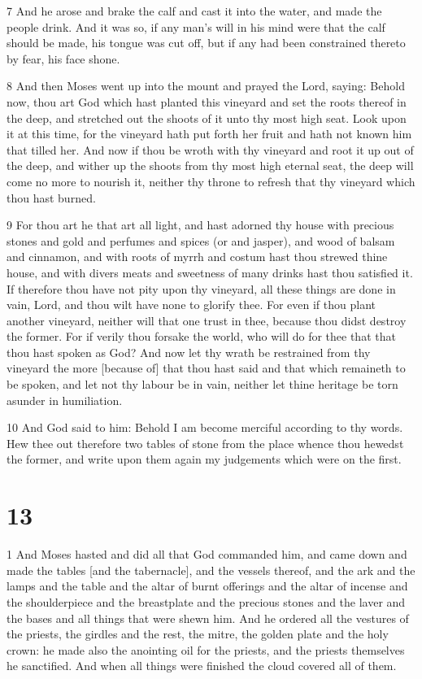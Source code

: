 \par 7 And he arose and brake the calf and cast it into the water, and made the people drink. And it was so, if any man's will in his mind were that the calf should be made, his tongue was cut off, but if any had been constrained thereto by fear, his face shone.

\par 8 And then Moses went up into the mount and prayed the Lord, saying: Behold now, thou art God which hast planted this vineyard and set the roots thereof in the deep, and stretched out the shoots of it unto thy most high seat. Look upon it at this time, for the vineyard hath put forth her fruit and hath not known him that tilled her. And now if thou be wroth with thy vineyard and root it up out of the deep, and wither up the shoots from thy most high eternal seat, the deep will come no more to nourish it, neither thy throne to refresh that thy vineyard which thou hast burned. 

\par 9 For thou art he that art all light, and hast adorned thy house with precious stones and gold and perfumes and spices (or and jasper), and wood of balsam and cinnamon, and with roots of myrrh and costum hast thou strewed thine house, and with divers meats and sweetness of many drinks hast thou satisfied it. If therefore thou have not pity upon thy vineyard, all these things are done in vain, Lord, and thou wilt have none to glorify thee. For even if thou plant another vineyard, neither will that one trust in thee, because thou didst destroy the former. For if verily thou forsake the world, who will do for thee that that thou hast spoken as God? And now let thy wrath be restrained from thy vineyard the more [because of] that thou hast said and that which remaineth to be spoken, and let not thy labour be in vain, neither let thine heritage be torn asunder in humiliation. 

\par 10 And God said to him: Behold I am become merciful according to thy words. Hew thee out therefore two tables of stone from the place whence thou hewedst the former, and write upon them again my judgements which were on the first.

\chapter{13}

\par 1 And Moses hasted and did all that God commanded him, and came down and made the tables [and the tabernacle], and the vessels thereof, and the ark and the lamps and the table and the altar of burnt offerings and the altar of incense and the shoulderpiece and the breastplate and the precious stones and the laver and the bases and all things that were shewn him. And he ordered all the vestures of the priests, the girdles and the rest, the mitre, the golden plate and the holy crown: he made also the anointing oil for the priests, and the priests themselves he sanctified. And when all things were finished the cloud covered all of them. 

